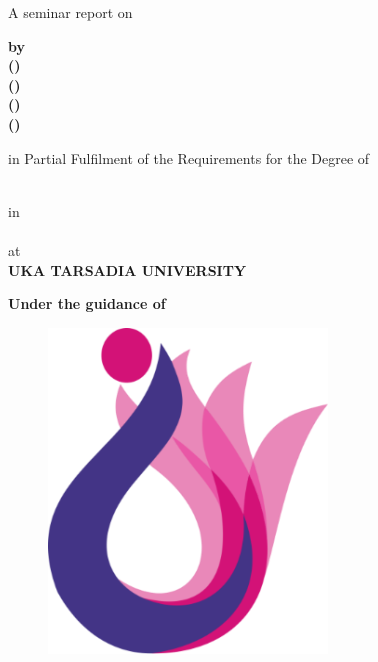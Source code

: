 
\thispagestyle{empty}

\begin{center}

{\large {A seminar report on}}
\vspace{0.6cm}

{\Huge \textbf{\reportTitle}}
\vspace{0.6cm}

{\large\textbf{by}}\\
{\large \bf \studentNameone} 
{\bf (\enrollmentNumberone)}\\
{\large \bf \studentNametwo} 
{\bf (\enrollmentNumbertwo)}\\
{\large \bf \studentNamethree} 
{\bf (\enrollmentNumberthree)}\\
{\large \bf \studentNamefour} 
{\bf (\enrollmentNumberfour)}\\
\vspace{0.9cm}

in Partial Fulfilment of the Requirements for the Degree of
\vspace{0.6cm}


{\large\textbf{\degreeName}}\\
{\large{in}}\\
{\large\textbf{\branchName}}\\
\vspace{0.9cm}
{\large{at}}\\
{\Large \textbf{UKA TARSADIA UNIVERSITY}}
\vspace{0.6cm}

{\large\textbf{Under the guidance of}}\\
{\large \bf \guideName}
\vspace{0.2cm}

\begin{figure}[h]
\begin{center}
 \includegraphics[scale=0.8]{UTU.png}
\end{center}
\end{figure}
{\bf \departmentName}\\
{\bf \instituteName}\\
{\bf \locationName}\\
{\bf \academicYear}
\end{center}

